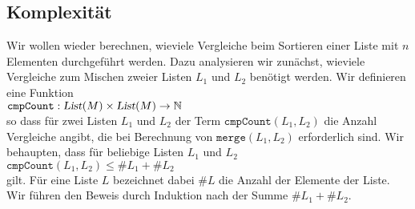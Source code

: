 \subsection{Komplexit\"at}
Wir wollen wieder berechnen, wieviele Vergleiche beim Sortieren einer Liste mit $n$
Elementen durchgef\"uhrt werden.  Dazu analysieren wir zun\"achst, wieviele Vergleiche zum
Mischen zweier Listen $L_1$ und $L_2$ ben\"otigt werden.  Wir definieren eine Funktion \\[0.2cm]
\hspace*{1.3cm} 
$\mathtt{cmpCount}: \textsl{List}(M) \times \textsl{List}(M) \rightarrow \mathbb{N}$ \\[0.2cm]
so dass f\"ur zwei Listen $L_1$ und $L_2$ der Term
$\mathtt{cmpCount}(L_1, L_2)$ die Anzahl Vergleiche angibt, die bei Berechnung von $\texttt{merge}(L_1,L_2)$ erforderlich sind. 
Wir behaupten, dass f\"ur beliebige Listen $L_1$ und $L_2$  \\[0.2cm]
\hspace*{1.3cm} $\mathtt{cmpCount}(L_1, L_2) \leq \# L_1 + \# L_2$ \\[0.2cm]
gilt.  F\"ur eine Liste $L$ bezeichnet dabei $\#L$ die Anzahl der Elemente der Liste.
 Wir f\"uhren den Beweis durch Induktion nach der Summe $\#L_1 + \#L_2$.
